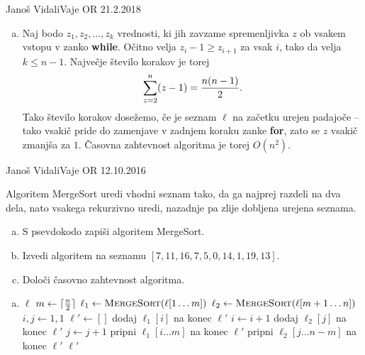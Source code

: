 \begin{naloga}{Janoš Vidali}{Vaje OR 21.2.2018}
\begin{odgovor}
\begin{enumerate}[(a)]
\item Naj bodo $z_1, z_2, \dots, z_k$ vrednosti,
ki jih zavzame spremenljivka $z$ ob vsakem vstopu v zanko {\bf while}.
Očitno velja $z_i - 1 \ge z_{i+1}$ za vsak $i$,
tako da velja $k \le n-1$.
Največje število korakov je torej
$$
\sum_{z=2}^n (z-1) = {n(n-1) \over 2} .
$$
Tako število korakov dosežemo,
če je seznam $\ell$ na začetku urejen padajoče
-- tako vsakič pride do zamenjave v zadnjem koraku zanke {\bf for},
zato se $z$ vsakič zmanjša za $1$.
Časovna zahtevnost algoritma je torej $O(n^2)$.
\end{enumerate}
\end{odgovor}
\end{naloga}


\begin{naloga}{Janoš Vidali}{Vaje OR 12.10.2016}
\begin{vprasanje}[mergesort]
Algoritem {\sc MergeSort} uredi vhodni seznam tako,
da ga najprej razdeli na dva dela,
nato vsakega rekurzivno uredi,
nazadnje pa zlije dobljena urejena seznama.
\begin{enumerate}[(a)]
\item S psevdokodo zapiši algoritem {\sc MergeSort}.
\item Izvedi algoritem na seznamu $[7, 11, 16, 7, 5, 0, 14, 1, 19, 13]$.
\item Določi časovno zahtevnost algoritma.
\end{enumerate}
\end{vprasanje}

\begin{odgovor}
\begin{enumerate}[(a)]
\item
\begin{small}
\begin{algorithmic}
        \State \Return $\ell$
    \EndIf
    \State $m \gets \lceil {n \over 2} \rceil$
    \State $\ell_1 \gets \text{\sc MergeSort}(\ell[1 \dots m])$
    \State $\ell_2 \gets \text{\sc MergeSort}(\ell[m+1 \dots n])$
    \State $i, j \gets 1, 1$
    \State $\ell' \gets []$
            \State dodaj $\ell_1[i]$ na konec $\ell'$
            \State $i \gets i+1$
        \Else
            \State dodaj $\ell_2[j]$ na konec $\ell'$
            \State $j \gets j+1$
        \EndIf
    \EndWhile
    \State pripni $\ell_1[i \dots m]$ na konec $\ell'$
    \State pripni $\ell_2[j \dots n-m]$ na konec $\ell'$
    \State \Return $\ell'$
\EndFunction
\end{algorithmic}
\end{small}


\end{enumerate}
\end{odgovor}
\end{naloga}
